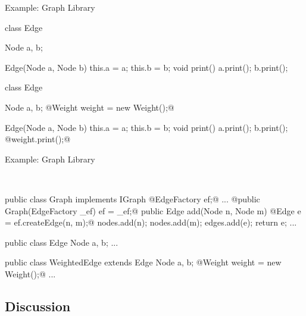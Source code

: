 \begin{frame}[fragile]{Example: Graph Library}
	\begin{mycolumns}[b,animation=none,height=\textheightwithtitle]
		\centering{} %
	\mynextcolumn
\begin{codetight}{}
class Edge {
	Node a, b;

	Edge(Node a, Node b) {
		this.a = a; this.b = b;
	}
	void print() {
		a.print(); b.print();
	}
}
\end{codetight}
\begin{codetight}{}
class Edge {
	Node a, b;
	@Weight weight = new Weight();@

	Edge(Node a, Node b) {
		this.a = a; this.b = b;
	}
	void print() {
		a.print(); b.print();
		@weight.print();@
	}
}
\end{codetight}
	\end{mycolumns}
\end{frame}

\begin{frame}[fragile]{Example: Graph Library}
\begin{tiny}	
	\begin{mycolumns}[columns=4,widths={10,30,10,60},animation=none]
		~
	\mynextcolumn
		\vspace{2mm}
	\mynextcolumn
		~
	\mynextcolumn
\begin{codetight}{}
public class Graph implements IGraph {
	@EdgeFactory ef;@
	...
	@public Graph(EdgeFactory _ef) {
		ef = _ef;@
	}
	public Edge add(Node n, Node m) {
		@Edge e = ef.createEdge(n, m);@
		nodes.add(n); nodes.add(m); edges.add(e);
		return e;
	}
	...
}
\end{codetight}
\begin{codetight}{}
public class Edge {
	Node a, b;
	...
}
\end{codetight}
\vspace{0.5cm}
\begin{codetight}{}
public class WeightedEdge extends Edge {
	Node a, b;
	@Weight weight = new Weight();@
	...
}
\end{codetight}
	\end{mycolumns}
\end{tiny}
\end{frame}

\subsection{Discussion}

